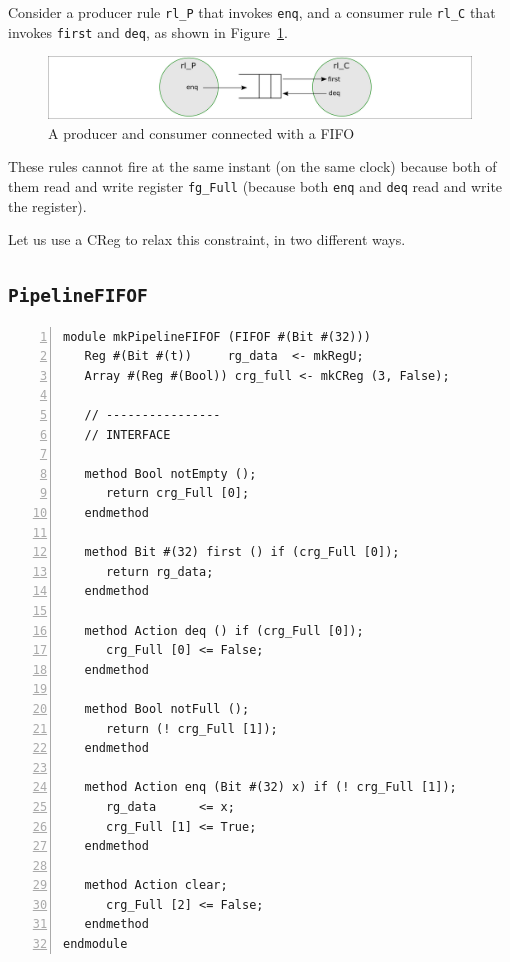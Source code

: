 Consider a producer rule \verb|rl_P| that invokes \verb|enq|, and a
consumer rule \verb|rl_C| that invokes \verb|first| and \verb|deq|,
as shown in Figure~\ref{Fig_FIFO_Producer_Consumer}.
\begin{figure}[htbp]
  \centerline{\includegraphics[width=6in,angle=0]{Figures/Fig_FIFO_Producer_Consumer}}
  \caption{\label{Fig_FIFO_Producer_Consumer}A producer and consumer connected with a FIFO}
\end{figure}

These rules cannot fire at the same instant (on the same clock)
because both of them read and write register \verb|fg_Full| (because
both \verb|enq| and \verb|deq| read and write the register).

Let us use a CReg to relax this constraint, in two different ways.


\subsection{{\tt PipelineFIFOF}}

{\footnotesize
\begin{Verbatim}[frame=single, numbers=left]
module mkPipelineFIFOF (FIFOF #(Bit #(32)))
   Reg #(Bit #(t))     rg_data  <- mkRegU;
   Array #(Reg #(Bool)) crg_full <- mkCReg (3, False);

   // ----------------
   // INTERFACE

   method Bool notEmpty ();
      return crg_Full [0];
   endmethod

   method Bit #(32) first () if (crg_Full [0]);
      return rg_data;
   endmethod

   method Action deq () if (crg_Full [0]);
      crg_Full [0] <= False;
   endmethod

   method Bool notFull ();
      return (! crg_Full [1]);
   endmethod

   method Action enq (Bit #(32) x) if (! crg_Full [1]);
      rg_data      <= x;
      crg_Full [1] <= True;
   endmethod

   method Action clear;
      crg_Full [2] <= False;
   endmethod
endmodule
\end{Verbatim}
}

